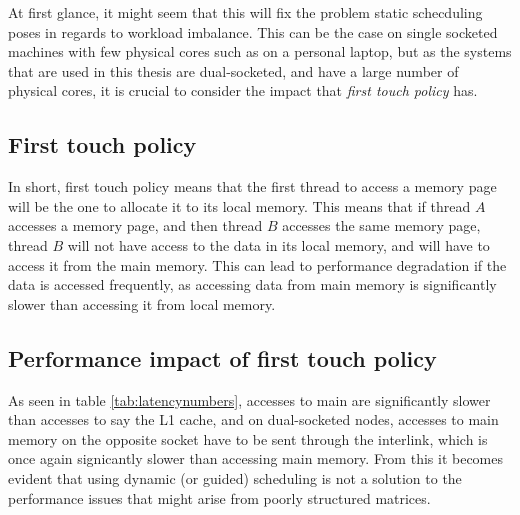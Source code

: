 At first glance, it might seem that this will fix the problem static schecduling poses in regards to workload imbalance. This can be the case on single socketed machines with few physical cores such as on a personal laptop, but as the systems that are used in this thesis are dual-socketed, and have a large number of physical cores, it is crucial to consider the impact that \textit{first touch policy} has.

\subsection{First touch policy}
In short, first touch policy means that the first thread to access a memory page will be the one to allocate it to its local memory. This means that if thread \(A\) accesses a memory page, and then thread \(B\) accesses the same memory page, thread \(B\) will not have access to the data in its local memory, and will have to access it from the main memory. This can lead to performance degradation if the data is accessed frequently, as accessing data from main memory is significantly slower than accessing it from local memory. 


\subsection{Performance impact of first touch policy}
As seen in table \ref{tab:latencynumbers}, accesses to main are significantly slower than accesses to say the L1 cache, and on dual-socketed nodes, accesses to main memory on the opposite socket have to be sent through the interlink, which is once again signicantly slower than accessing main memory. From this it becomes evident that using dynamic (or guided) scheduling is not a solution to the performance issues that might arise from poorly structured matrices.











